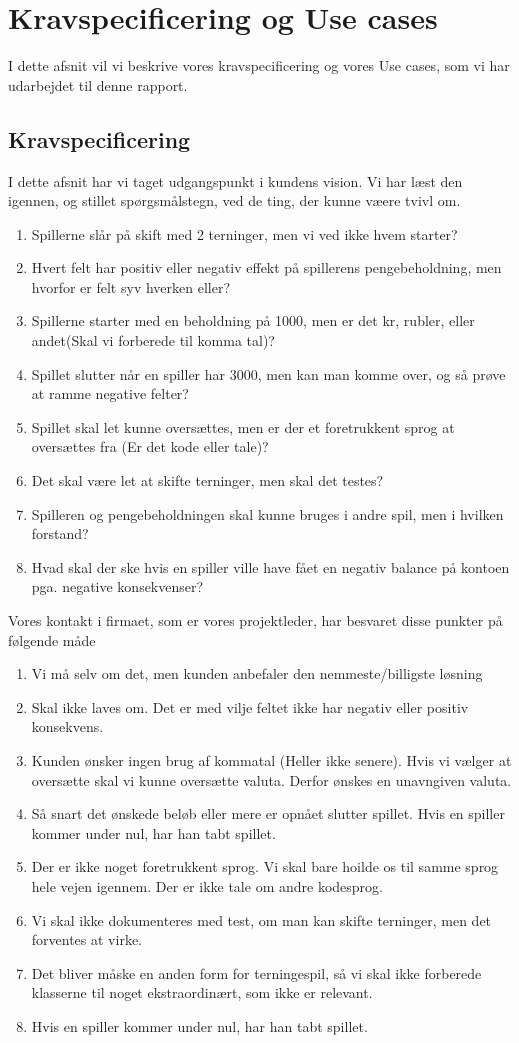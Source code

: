 \section{Kravspecificering og Use cases}
I dette afsnit vil vi beskrive vores kravspecificering og vores Use cases, som vi har udarbejdet til denne rapport.
\subsection{Kravspecificering}
I dette afsnit har vi taget udgangspunkt i kundens vision. Vi har læst den igennen, og stillet spørgsmålstegn, ved de ting, der kunne væere tvivl om.
\begin{enumerate}
\item Spillerne slår på skift med 2 terninger, men vi ved ikke hvem starter?
\item Hvert felt har positiv eller negativ effekt på spillerens pengebeholdning, men hvorfor er felt syv hverken eller?
\item Spillerne starter med en beholdning på 1000, men er det kr, rubler, eller andet(Skal vi forberede til komma tal)?
\item Spillet slutter når en spiller har 3000, men kan man komme over, og så prøve at ramme negative felter?
\item Spillet skal let kunne oversættes, men er der et foretrukkent sprog at oversættes fra (Er det kode eller tale)?
\item Det skal være let at skifte terninger, men skal det testes?
\item Spilleren og pengebeholdningen skal kunne bruges i andre spil, men i hvilken forstand?
\item Hvad skal der ske hvis en spiller ville have fået en negativ balance på kontoen pga. negative konsekvenser?
\end{enumerate}
Vores kontakt i firmaet, som er vores projektleder, har besvaret disse punkter på følgende måde
\begin{enumerate}
\item Vi må selv om det, men kunden anbefaler den nemmeste/billigste løsning
\item Skal ikke laves om. Det er med vilje feltet ikke har negativ eller positiv konsekvens.
\item Kunden ønsker ingen brug af kommatal (Heller ikke senere). Hvis vi vælger at oversætte skal vi kunne oversætte valuta. Derfor ønskes en unavngiven valuta.
\item Så snart det ønskede beløb eller mere er opnået slutter spillet. Hvis en spiller kommer under nul, har han tabt spillet.
\item Der er ikke noget foretrukkent sprog. Vi skal bare hoilde os til samme sprog hele vejen igennem. Der er ikke tale om andre kodesprog.
\item Vi skal ikke dokumenteres med test, om man kan skifte terninger, men det forventes at virke.
\item Det bliver måske en anden form for terningespil, så vi skal ikke forberede klasserne til noget ekstraordinært, som ikke er relevant.
\item Hvis en spiller kommer under nul, har han tabt spillet.
\end{enumerate}

